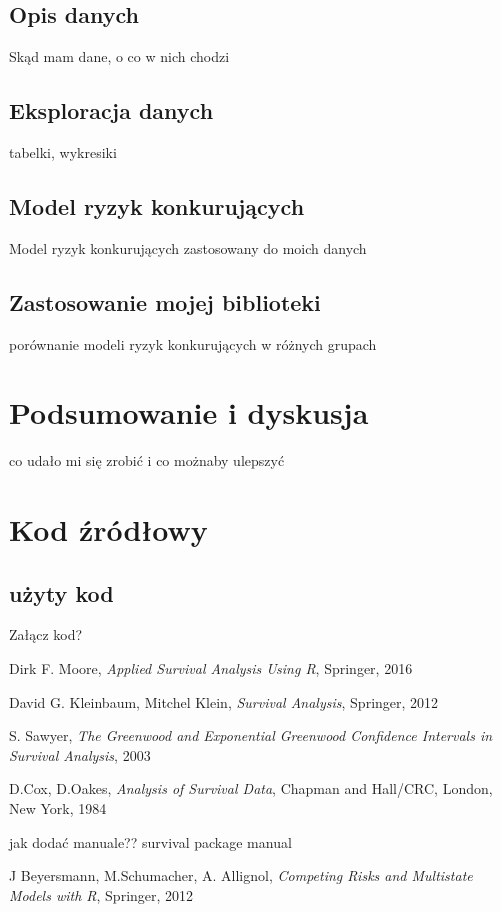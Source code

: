\documentclass[]{pracamgr}
\begin{document}
\section{Opis danych}

Skąd mam dane, o co w nich chodzi

\section{Eksploracja danych}

tabelki, wykresiki

\section{Model ryzyk konkurujących}

Model ryzyk konkurujących zastosowany do moich danych

\section{Zastosowanie mojej biblioteki}
porównanie modeli ryzyk konkurujących w różnych grupach


\chapter{Podsumowanie i dyskusja}\label{r:impl}

co udało mi się zrobić i co możnaby ulepszyć

\chapter{Kod źródłowy}
\section{użyty kod}

Załącz kod?


\begin{thebibliography}{99}

 Dirk F. Moore, \textit{Applied Survival Analysis Using R}, Springer, 2016

 David G. Kleinbaum, Mitchel Klein, \textit{Survival Analysis}, Springer, 2012

 S. Sawyer, \textit{The Greenwood and Exponential Greenwood Confidence Intervals in Survival Analysis}, 2003

 D.Cox, D.Oakes, \textit{Analysis of Survival Data}, Chapman and Hall/CRC, London, New York, 1984

 {\color{red}jak dodać manuale??} survival package manual

 J Beyersmann, M.Schumacher, A. Allignol, \textit{Competing Risks and Multistate Models with R}, Springer, 2012

\end{thebibliography}
\end{document}
